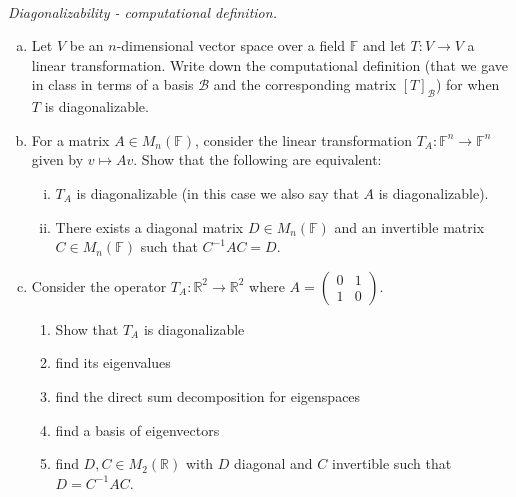 \documentclass{article}
\begin{document}
\begin{problem} \\
    \textit{Diagonalizability - computational definition.} \\
    \begin{enumerate}[(a)]
        \item Let $V$ be an $n$-dimensional vector space over a field $\mathbb{F}$ and let $T: V \to V$ a linear transformation. Write down the computational definition (that we gave in class in terms of a basis $\mathscr{B}$ and the corresponding matrix $[T]_{\mathscr{B}}$) for when $T$ is diagonalizable.
        \item For a matrix $A \in M_n(\mathbb{F})$, consider the linear transformation $T_A: \mathbb{F}^n \to \mathbb{F}^n$ given by $v \mapsto Av$. Show that the following are equivalent:
        \begin{enumerate}[(i)]
            \item $T_A$ is diagonalizable (in this case we also say that $A$ is diagonalizable).
            \item There exists a diagonal matrix $D \in M_n(\mathbb{F})$ and an invertible matrix $C \in M_n(\mathbb{F})$ such that $C^{-1} A C = D$.
        \end{enumerate}
        \item Consider the operator $T_A: \mathbb{R}^2 \to \mathbb{R}^2$ where $A = \begin{pmatrix}
            0 & 1 \\
            1 & 0
        \end{pmatrix}$. 
        \begin{enumerate}
            \item Show that $T_A$ is diagonalizable
            \item find its eigenvalues
            \item find the direct sum decomposition for eigenspaces
            \item find a basis of eigenvectors
            \item find $D,C \in M_2(\mathbb{R})$ with $D$ diagonal and $C$ invertible such that $D = C^{-1} A C$.
        \end{enumerate}
    \end{enumerate}
\end{problem}
\end{document}

